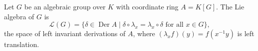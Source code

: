 Let $G$ be an algebraic group over $K$ with coordinate ring $A = K[G]$. The Lie algebra of $G$ is
$$\mathcal{L}(G) = \{\delta \in \operatorname{Der} A \mid \delta \circ \lambda_x = \lambda_x \circ \delta \text{ for all } x \in G\},$$
the space of left invariant derivations of $A$, where $(\lambda_x f)(y) = f(x^{-1}y)$ is left translation.
